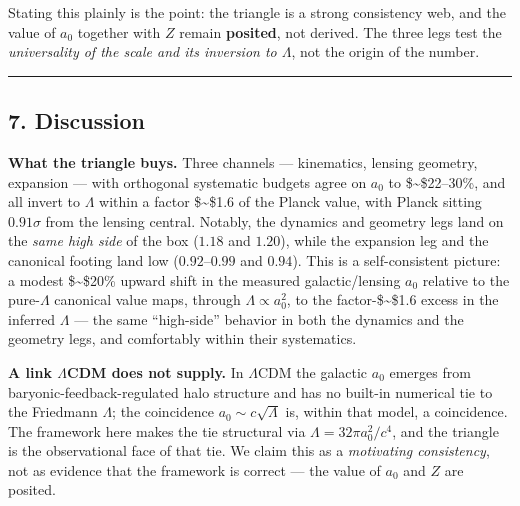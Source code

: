 \documentclass[
]{article}
\begin{document}
Stating this plainly is the point: the triangle is a strong consistency
web, and the value of \(a_0\) together with \(Z\) remain
\textbf{posited}, not derived. The three legs test the
\emph{universality of the scale and its inversion to \(\Lambda\)}, not
the origin of the number.

\begin{center}\rule{0.5\linewidth}{0.5pt}\end{center}

\subsection{7. Discussion}\label{discussion}

\textbf{What the triangle buys.} Three channels --- kinematics, lensing
geometry, expansion --- with orthogonal systematic budgets agree on
\(a_0\) to \$\sim\$22--30\%, and all invert to \(\Lambda\) within a
factor \$\sim\$1.6 of the Planck value, with Planck sitting
\(0.91\sigma\) from the lensing central. Notably, the dynamics and
geometry legs land on the \emph{same high side} of the box (\(1.18\) and
\(1.20\)), while the expansion leg and the canonical footing land low
(\(0.92\)--\(0.99\) and \(0.94\)). This is a self-consistent picture: a
modest \$\sim\$20\% upward shift in the measured galactic/lensing
\(a_0\) relative to the pure-\(\Lambda\) canonical value maps, through
\(\Lambda\propto a_0^2\), to the factor-\$\sim\$1.6 excess in the
inferred \(\Lambda\) --- the same ``high-side'' behavior in both the
dynamics and the geometry legs, and comfortably within their
systematics.

\textbf{A link \(\Lambda\)CDM does not supply.} In \(\Lambda\)CDM the
galactic \(a_0\) emerges from baryonic-feedback-regulated halo structure
and has no built-in numerical tie to the Friedmann \(\Lambda\); the
coincidence \(a_0\sim c\sqrt\Lambda\) is, within that model, a
coincidence. The framework here makes the tie structural via
\(\Lambda = 32\pi a_0^2/c^4\), and the triangle is the observational
face of that tie. We claim this as a \emph{motivating consistency}, not
as evidence that the framework is correct --- the value of \(a_0\) and
\(Z\) are posited.
\end{document}
